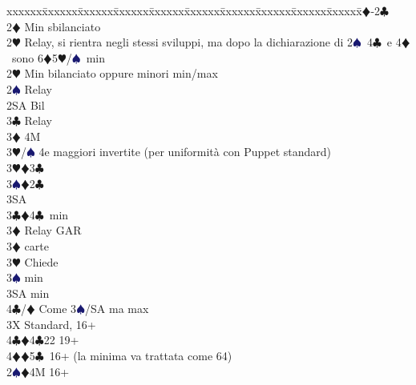 \documentclass[a4paper,italian]{article}
\newcommand{\BC}{\textcolor{OliveGreen}{$\clubsuit$}}
\newcommand{\BD}{\textcolor{RedOrange}{$\vardiamondsuit$}}
\newcommand{\BH}{\textcolor{Red2}{$\varheartsuit${}}}
\newcommand{\BS}{\textcolor{MidnightBlue}{$\spadesuit${}}}
\newenvironment{bidtable}
{\begin{tabbing}

    xxxxxx\=xxxxxx\=xxxxxx\=xxxxxx\=xxxxxx\=xxxxxx\=xxxxxx\=xxxxxx\=xxxxxx\=xxxxxx\=\kill}
{\end{tabbing} }%
\begin{document}
                                    \begin{bidtable}
                                        1\BD-2\BC\+\\
                                        2\BD \> Min sbilanciato\+\\
                                        2\BH \> Relay, si rientra negli stessi sviluppi, ma dopo la dichiarazione di 2\BS\ 4\BC\ e 4\BD\ sono 6\BD 5\BH /\BS\ min\-\\
                                        2\BH \> Min bilanciato oppure minori min/max\+\\
                                        2\BS \> Relay\+\\
                                        2SA \> Bil\+\\
                                        3\BC \> Relay\+\\
                                        3\BD \> 4M\+\\
                                        3\BH/\BS \> 4e maggiori invertite (per uniformità con Puppet standard)\-\\
                                        3\BH {}\BD 3\BC \\
                                        3\BS {}\BD 2\BC \\
                                        3SA \-\-\\
                                        3\BC {}\BD 4\BC\ min\+\\
                                        3\BD \> Relay GAR\-\\
                                        3\BD {} carte\+\\
                                        3\BH \> Chiede\+\\
                                        3\BS {} min\\
                                        3SA  min\\
                                        4\BC/\BD \> Come 3\BS /SA ma max\-\-\\
                                        3X \> Standard, 16+\\
                                        4\BC {}\BD 4\BC 22 19+\\
                                        4\BD {}\BD 5\BC\ 16+ (la minima va trattata come 64)\-\-\\
                                        2\BS {}\BD 4M 16+\+\\

\end{bidtable}
\end{document}
